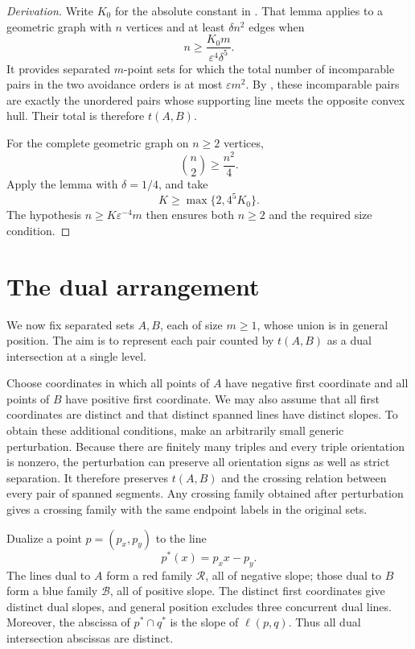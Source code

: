 \documentclass[12pt]{article}
\newcommand{\RR}{\mathcal R}
\newcommand{\BB}{\mathcal B}
\begin{document}
\begin{proof}[Derivation]
Write \(K_0\) for the absolute constant in
\cite[Lemma~3.3]{PRT2021}. That lemma applies to a geometric graph
with \(n\) vertices and at least \(\delta n^2\) edges when
\[
 n\geq \frac{K_0m}{\varepsilon^4\delta^5}.
\]
It provides separated \(m\)-point sets for which the total number
of incomparable pairs in the two avoidance orders is at most
\(\varepsilon m^2\). By \cite[Definition~3.1 and Lemma~2.2]{PRT2021},
these incomparable pairs are exactly the unordered pairs whose
supporting line meets the opposite convex hull. Their total is
therefore \(t(A,B)\).

For the complete geometric graph on \(n\geq2\) vertices,
\[
 \binom n2\geq \frac{n^2}{4}.
\]
Apply the lemma with \(\delta=1/4\), and take
\[
 K\geq\max\{2,4^5K_0\}.
\]
The hypothesis \(n\geq K\varepsilon^{-4}m\) then ensures both
\(n\geq2\) and the required size condition.
\end{proof}

\section{The dual arrangement}\label{sec:dual}

We now fix separated sets \(A,B\), each of size \(m\geq1\), whose
union is in general position. The aim is to represent each pair
counted by \(t(A,B)\) as a dual intersection at a single level.

Choose coordinates in which all points of \(A\) have negative first
coordinate and all points of \(B\) have positive first coordinate.
We may also assume that all first coordinates are distinct and that
distinct spanned lines have distinct slopes. To obtain these
additional conditions, make an arbitrarily small generic
perturbation. Because there are finitely many triples and every
triple orientation is nonzero, the perturbation can preserve all
orientation signs as well as strict separation. It therefore
preserves \(t(A,B)\) and the crossing relation between every pair
of spanned segments. Any crossing family obtained after perturbation
gives a crossing family with the same endpoint labels in the
original sets.

Dualize a point \(p=(p_x,p_y)\) to the line
\[
 p^*(x)=p_xx-p_y.
\]
The lines dual to \(A\) form a red family \(\RR\), all of negative
slope; those dual to \(B\) form a blue family \(\BB\), all of
positive slope. The distinct first coordinates give distinct dual
slopes, and general position excludes three concurrent dual lines.
Moreover, the abscissa of \(p^*\cap q^*\) is the slope of
\(\ell(p,q)\). Thus all dual intersection abscissas are distinct.
\end{document}
